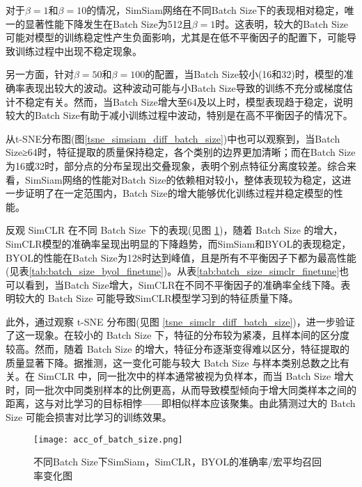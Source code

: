 \documentclass[master]{thesis-uestc}
\begin{document}
对于$\beta=1$和$\beta=10$的情况，SimSiam网络在不同Batch Size下的表现相对稳定，唯一的显著性能下降发生在Batch Size为512且$\beta=1$时。这表明，较大的Batch Size可能对模型的训练稳定性产生负面影响，尤其是在低不平衡因子的配置下，可能导致训练过程中出现不稳定现象。

另一方面，针对$\beta=50$和$\beta=100$的配置，当Batch Size较小(16和32)时，模型的准确率表现出较大的波动。这种波动可能与小Batch Size导致的训练不充分或梯度估计不稳定有关。然而，当Batch Size增大至64及以上时，模型表现趋于稳定，说明较大的Batch Size有助于减小训练过程中波动，特别是在高不平衡因子的情况下。

从t-SNE分布图(图\ref{tsne_simsiam_diff_batch_size})中也可以观察到，当Batch Size≥64时，特征提取的质量保持稳定，各个类别的边界更加清晰；而在Batch Size为16或32时，部分点的分布呈现出交叠现象，表明个别点特征分离度较差。综合来看，SimSiam网络的性能对Batch Size的依赖相对较小，整体表现较为稳定，这进一步证明了在一定范围内，Batch Size的增大能够优化训练过程并稳定模型的性能。

反观 SimCLR 在不同 Batch Size 下的表现(见图 \ref{acc_of_batch_size})，随着 Batch Size 的增大，SimCLR模型的准确率呈现出明显的下降趋势，而SimSiam和BYOL的表现稳定，BYOL的性能在Batch Size为128时达到峰值，且是所有不平衡因子下都为最高性能(见表\ref{tab:batch_size_byol_finetune})。从表\ref{tab:batch_size_simclr_finetune}也可以看到，当Batch Size增大，SimCLR在不同不平衡因子的准确率全线下降。表明较大的 Batch Size 可能导致SimCLR模型学习到的特征质量下降。

此外，通过观察 t-SNE 分布图(见图 \ref{tsne_simclr_diff_batch_size})，进一步验证了这一现象。在较小的 Batch Size 下，特征的分布较为紧凑，且样本间的区分度较高。然而，随着 Batch Size 的增大，特征分布逐渐变得难以区分，特征提取的质量显著下降。据推测，这一变化可能与较大 Batch Size 与样本类别总数之比有关。在 SimCLR 中，同一批次中的样本通常被视为负样本，而当 Batch Size 增大时，同一批次中同类别样本的比例更高，从而导致模型倾向于增大同类样本之间的距离，这与对比学习的目标相悖——即相似样本应该聚集。由此猜测过大的 Batch Size 可能会损害对比学习的训练效果。

\begin{figure}[h]
    \centering
    \texttt{[image: acc\_of\_batch\_size.png]}
    \caption{不同Batch Size下SimSiam，SimCLR，BYOL的准确率/宏平均召回率变化图}
    \label{acc_of_batch_size}
\end{figure}
\end{document}
